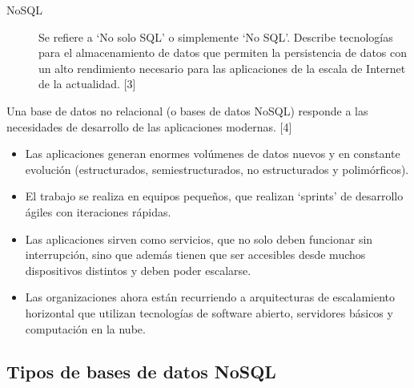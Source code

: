 \documentclass[twocolumn]{article}
\begin{document}
\begin{description}
  \item[NoSQL] Se refiere a `No solo SQL' o simplemente `No SQL'. Describe tecnologías para el almacenamiento de datos que permiten la persistencia de datos con un alto rendimiento necesario para las aplicaciones de la escala de Internet de la actualidad. [3]
\end{description}

Una base de datos no relacional (o bases de datos NoSQL) responde a las necesidades de desarrollo de las aplicaciones modernas. [4]

\begin{itemize}
  \item Las aplicaciones generan enormes volúmenes de datos nuevos y en constante evolución (estructurados, semiestructurados, no estructurados y polimórficos).
  \item El trabajo se realiza en equipos pequeños, que realizan `sprints' de desarrollo ágiles con iteraciones rápidas.
  \item Las aplicaciones sirven como servicios, que no solo deben funcionar sin interrupción, sino que además tienen que ser accesibles desde muchos dispositivos distintos y deben poder escalarse.
  \item Las organizaciones ahora están recurriendo a arquitecturas de escalamiento horizontal que utilizan tecnologías de software abierto, servidores básicos y computación en la nube.
\end{itemize}

\subsection{Tipos de bases de datos NoSQL}
\end{document}

